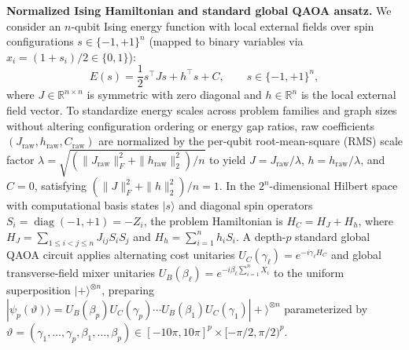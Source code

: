 \documentclass[10pt,a4paper]{article}
\begin{document}
\textbf{Normalized Ising Hamiltonian and standard global QAOA ansatz.} We consider an $n$-qubit Ising energy function with local external fields over spin configurations $s \in \{-1, +1\}^n$ (mapped to binary variables via $x_i = (1 + s_i)/2 \in \{0, 1\}$):
\[
E(s) = \frac{1}{2}s^\top J s + h^\top s + C, \qquad s \in \{-1, +1\}^n,
\]
where $J \in \mathbb{R}^{n \times n}$ is symmetric with zero diagonal and $h \in \mathbb{R}^n$ is the local external field vector. To standardize energy scales across problem families and graph sizes without altering configuration ordering or energy gap ratios, raw coefficients $(J_{\mathrm{raw}}, h_{\mathrm{raw}}, C_{\mathrm{raw}})$ are normalized by the per-qubit root-mean-square (RMS) scale factor $\lambda = \sqrt{(\|J_{\mathrm{raw}}\|_F^2 + \|h_{\mathrm{raw}}\|_2^2)/n}$ to yield $J = J_{\mathrm{raw}}/\lambda$, $h = h_{\mathrm{raw}}/\lambda$, and $C = 0$, satisfying $(\|J\|_F^2 + \|h\|_2^2)/n = 1$. In the $2^n$-dimensional Hilbert space with computational basis states $|s\rangle$ and diagonal spin operators $S_i = \operatorname{diag}(-1, +1) = -Z_i$, the problem Hamiltonian is $H_C = H_J + H_h$, where $H_J = \sum_{1 \le i < j \le n} J_{ij} S_i S_j$ and $H_h = \sum_{i=1}^n h_i S_i$. A depth-$p$ standard global QAOA circuit applies alternating cost unitaries $U_C(\gamma_\ell) = e^{-i\gamma_\ell H_C}$ and global transverse-field mixer unitaries $U_B(\beta_\ell) = e^{-i\beta_\ell \sum_{i=1}^n X_i}$ to the uniform superposition $|+\rangle^{\otimes n}$, preparing $|\psi_p(\vartheta)\rangle = U_B(\beta_p)U_C(\gamma_p)\cdots U_B(\beta_1)U_C(\gamma_1)|+\rangle^{\otimes n}$ parameterized by $\vartheta = (\gamma_1, \ldots, \gamma_p, \beta_1, \ldots, \beta_p) \in [-10\pi, 10\pi]^p \times [-\pi/2, \pi/2)^p$.
\end{document}
